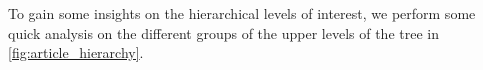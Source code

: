

To gain some insights on the hierarchical levels of interest, we perform some quick analysis on the different groups of the upper levels of the tree in \autoref{fig:article_hierarchy}. 